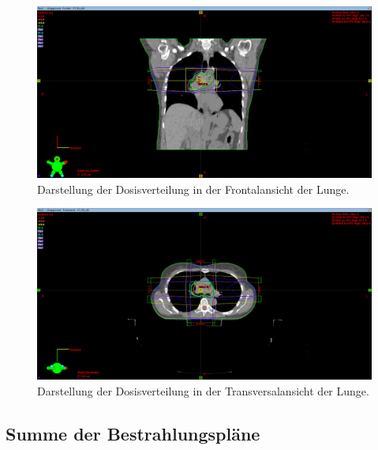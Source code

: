 \begin{figure}[H]
	\centering
	\includegraphics[width=\linewidth]{Bilder/Lunge2_Y}
	\caption{Darstellung der Dosisverteilung in der Frontalansicht der Lunge.}
	\label{fig:lunge2y}
\end{figure}

\begin{figure}[H]
	\centering
	\includegraphics[width=\linewidth]{Bilder/Lunge2_Z}
	\caption{Darstellung der Dosisverteilung in der Transversalansicht der Lunge.}
	\label{fig:lunge2z}
\end{figure}


\subsection*{Summe der Bestrahlungspläne}

